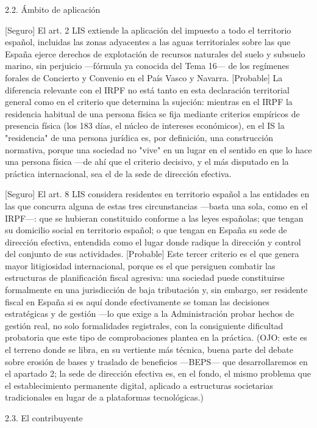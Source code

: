 \documentclass[10pt,a4paper]{article}
\begin{document}
2.2. Ámbito de aplicación

[Seguro] El art. 2 LIS extiende la aplicación del impuesto a todo el territorio español, incluidas las zonas adyacentes a las aguas territoriales sobre las que España ejerce derechos de explotación de recursos naturales del suelo y subsuelo marino, sin perjuicio —fórmula ya conocida del Tema 16— de los regímenes forales de Concierto y Convenio en el País Vasco y Navarra. [Probable] La diferencia relevante con el IRPF no está tanto en esta declaración territorial general como en el criterio que determina la sujeción: mientras en el IRPF la residencia habitual de una persona física se fija mediante criterios empíricos de presencia física (los 183 días, el núcleo de intereses económicos), en el IS la "residencia" de una persona jurídica es, por definición, una construcción normativa, porque una sociedad no "vive" en un lugar en el sentido en que lo hace una persona física —de ahí que el criterio decisivo, y el más disputado en la práctica internacional, sea el de la sede de dirección efectiva.

[Seguro] El art. 8 LIS considera residentes en territorio español a las entidades en las que concurra alguna de estas tres circunstancias —basta una sola, como en el IRPF—: que se hubieran constituido conforme a las leyes españolas; que tengan su domicilio social en territorio español; o que tengan en España su sede de dirección efectiva, entendida como el lugar donde radique la dirección y control del conjunto de sus actividades. [Probable] Este tercer criterio es el que genera mayor litigiosidad internacional, porque es el que persiguen combatir las estructuras de planificación fiscal agresiva: una sociedad puede constituirse formalmente en una jurisdicción de baja tributación y, sin embargo, ser residente fiscal en España si es aquí donde efectivamente se toman las decisiones estratégicas y de gestión —lo que exige a la Administración probar hechos de gestión real, no solo formalidades registrales, con la consiguiente dificultad probatoria que este tipo de comprobaciones plantea en la práctica. (OJO: este es el terreno donde se libra, en su vertiente más técnica, buena parte del debate sobre erosión de bases y traslado de beneficios —BEPS— que desarrollaremos en el apartado 2; la sede de dirección efectiva es, en el fondo, el mismo problema que el establecimiento permanente digital, aplicado a estructuras societarias tradicionales en lugar de a plataformas tecnológicas.)

2.3. El contribuyente
\end{document}
